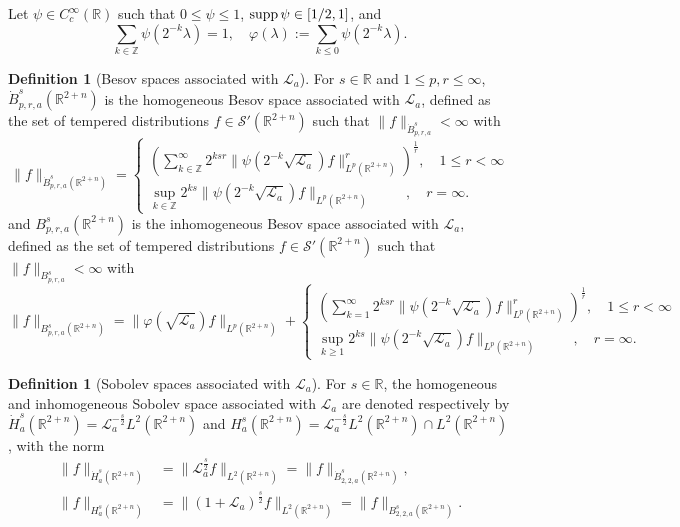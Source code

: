 \documentclass[a4paper,11pt, reqno]{amsart}
\numberwithin{equation}{section}
\theoremstyle{plain}
\theoremstyle{definition}
\newtheorem{definition}[theorem]{Definition}
\theoremstyle{remark}
\def\supp{\hbox{supp\,}}
\begin{document}
Let $\psi\in C_c^\infty(\mathbb{R})$ such that $0\leq \psi\leq 1$, $\supp \psi\in [1/2,1]$, and 
\begin{equation*}
\sum_{k\in \mathbb{Z}} \psi(2^{-k}\lambda)=1,\quad \varphi(\lambda):=\sum_{k\leq 0} \psi(2^{-k}\lambda).
\end{equation*}
\begin{definition}[Besov spaces associated with $\mathcal{L}_a$]
For $s\in\mathbb{R}$ and $1\leq p,r\leq\infty$, $\dot{B}^{s}_{p,r,a}(\mathbb{R}^{2+n})$ is the homogeneous Besov space associated with $\mathcal{L}_a$, defined as the set of tempered distributions $f \in \mathcal{S}'\left(\mathbb{R}^{2+n}\right)$ such that $\|f\|_{\dot{B}^{s}_{p,r,a}}<\infty$ with
\begin{equation*}
\|f\|_{\dot{B}^{s}_{p,r,a}(\mathbb{R}^{2+n})}=\begin{cases}\left(\sum\limits_{k\in\mathbb{Z}}^\infty2^{ksr}\|\psi(2^{-k}\sqrt{\mathcal{L}_a})f\|_{L^p(\mathbb{R}^{2+n})}^r\right)^{\frac{1}r},\quad 1\leq r<\infty\\
 \sup\limits_{k\in\mathbb{Z}} 2^{ks}\|\psi(2^{-k}\sqrt{\mathcal{L}_a})f\|_{L^p(\mathbb{R}^{2+n})}\,\;\quad\quad,\quad r=\infty.
 \end{cases}
	\end{equation*} 
and $B^{s}_{p,r,a}(\mathbb{R}^{2+n})$ is the inhomogeneous Besov space associated with $\mathcal{L}_a$, defined as the set of tempered distributions $f \in \mathcal{S}'\left(\mathbb{R}^{2+n}\right)$ such that $\|f\|_{B^{s}_{p,r,a}}<\infty$ with
\begin{equation*}
\|f\|_{B^{s}_{p,r,a}(\mathbb{R}^{2+n})}=\|\varphi(\sqrt{\mathcal{L}_a})f\|_{L^p(\mathbb{R}^{2+n})}+\begin{cases}\left(\sum\limits_{k=1}^\infty2^{ksr}\|\psi(2^{-k}\sqrt{\mathcal{L}_a})f\|_{L^p(\mathbb{R}^{2+n})}^r\right)^{\frac{1}r},\quad 1\leq r<\infty\\
 \sup\limits_{k\geq1} 2^{ks}\|\psi(2^{-k}\sqrt{\mathcal{L}_a})f\|_{L^p(\mathbb{R}^{2+n})}\,\;\quad\quad,\quad r=\infty.
 \end{cases}
	\end{equation*}
\end{definition}
\begin{definition}[Sobolev spaces associated with $\mathcal{L}_a$]For $s \in\mathbb{R}$, the homogeneous and inhomogeneous Sobolev space associated with $\mathcal{L}_a$ are denoted respectively by $\dot{H}_a^s(\mathbb{R}^{2+n})=\mathcal{L}_a^{-\frac{s}{2}} L^2(\mathbb{R}^{2+n})$ and $H_a^s(\mathbb{R}^{2+n})=\mathcal{L}_a^{-\frac{s}{2}} L^2(\mathbb{R}^{2+n})\cap  L^2(\mathbb{R}^{2+n})$, with the norm
 \begin{align*}
	\|f\|_{\dot{H}_a^s(\mathbb{R}^{2+n})}&=\|\mathcal{L}_a^{\frac{s}{2}}f\|_{L^2(\mathbb{R}^{2+n})}=\|f\|_{\dot{B}^{s}_{2,2,a}(\mathbb{R}^{2+n})},\\
    \|f\|_{H_a^s(\mathbb{R}^{2+n})}&=\|(1+\mathcal{L}_a)^{\frac{s}{2}}f\|_{L^2(\mathbb{R}^{2+n})}=\|f\|_{B^{s}_{2,2,a}(\mathbb{R}^{2+n})}.
	\end{align*}
\end{definition}
\end{document}
